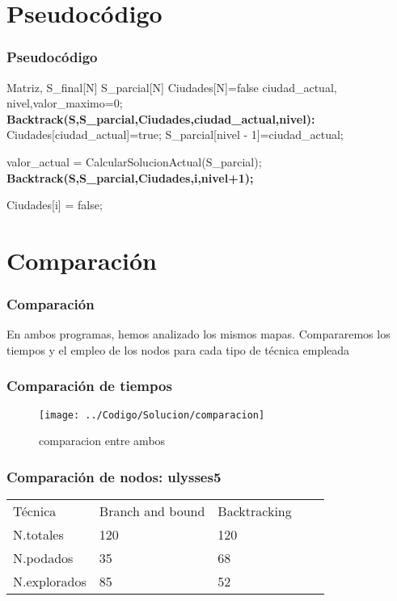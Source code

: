 \documentclass{beamer}
\begin{document}
\section{Pseudocódigo}
\begin{frame}
	\frametitle{Pseudocódigo}
	\footnotesize{	
		\begin{algorithmic}				
			\Require Matriz, S\_final[N] S\_parcial[N] Ciudades[N]={false} ciudad\_actual, nivel,valor\_maximo=0;
			\State \textbf{Backtrack(S,S\_parcial,Ciudades,ciudad\_actual,nivel):}
			\State Ciudades[ciudad\_actual]=true;
			\State	   S\_parcial[nivel - 1]=ciudad\_actual;
			
			\State 	valor\_actual = CalcularSolucionActual(S\_parcial);
			\State 	\textbf{Backtrack(S,S\_parcial,Ciudades,i,nivel+1);}
			\EndIf
			\EndIf
			
			\State Ciudades[i] = false;
			\EndIf
			\EndFor
			\end{algorithmic}			
			}
		\end{frame}


\section{Comparación}
\begin{frame}
	\frametitle{Comparación}
	En ambos programas, hemos analizado los mismos mapas. Compararemos los tiempos y el empleo de los nodos para cada tipo de técnica empleada
\end{frame}


\begin{frame}
	\frametitle{Comparación de tiempos}
	\begin{figure}[H]
\centering
\texttt{[image: ../Codigo/Solucion/comparacion]}
\caption{comparacion entre ambos }
\label{fig:comparacion}
\end{figure}


\end{frame}


\begin{frame}
	\frametitle{Comparación de nodos: ulysses5}
	
	\begin{table}[]
		\centering
	
		\label{my-label}
		\begin{tabular}{lllll}
	Técnica	& Branch and bound & Backtracking  &   \\
	N.totales& 120&120  &  &  \\
	N.podados&  35& 68 &  &  \\
	N.explorados&85  &52  &  &  \\

		\end{tabular}
	\end{table}
	
\end{frame}
\end{document}
